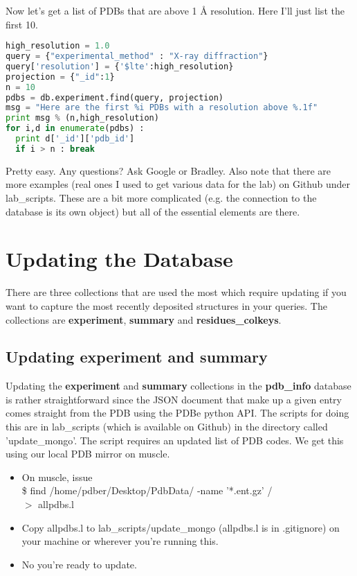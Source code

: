 \documentclass[12pt]{article}
\newcommand{\mdbdb}[1]{{\color{BlueViolet}\textbf{#1}}}
\newcommand{\mdbcol}[1]{{\color{Bittersweet}\textbf{#1}}}
\begin{document}
\noindent
Now let's get a list of PDBs that are above 1 \AA{} resolution.
Here I'll just list the first 10.

\begin{lstlisting}[language=python]
high_resolution = 1.0
query = {"experimental_method" : "X-ray diffraction"}
query['resolution'] = {'$lte':high_resolution}
projection = {"_id":1}
n = 10
pdbs = db.experiment.find(query, projection)
msg = "Here are the first %i PDBs with a resolution above %.1f"
print msg % (n,high_resolution)
for i,d in enumerate(pdbs) :
  print d['_id']['pdb_id']
  if i > n : break
\end{lstlisting}

\noindent
Pretty easy.
Any questions?
Ask Google or Bradley.
Also note that there are more examples (real ones I used to get various data for the lab) on Github under lab\_scripts.
These are a bit more complicated (e.g. the connection to the database is its own object) but all of the essential elements are there.

\section{Updating the Database}

There are three collections that are used the most which require updating if you want to capture the most recently deposited structures in your queries. The collections are \mdbcol{experiment}, \mdbcol{summary} and \mdbcol{residues\_colkeys}.

\subsection{Updating \mdbcol{experiment} and \mdbcol{summary}}

Updating the \mdbcol{experiment} and \mdbcol{summary} collections in the \mdbdb{pdb\_info} database is rather straightforward since the JSON document that make up a given entry comes straight from the PDB using the PDBe python API. The scripts for doing this are in lab\_scripts (which is available on Github) in the directory called 'update\_mongo'. The script requires an updated list of PDB codes. We get this using our local PDB mirror on muscle.

\begin{itemize}
\item On muscle, issue \\
\indent
\$ find /home/pdber/Desktop/PdbData/ -name '*.ent.gz' /\\ $>$ allpdbs.l
\item Copy allpdbs.l to lab\_scripts/update\_mongo (allpdbs.l is in .gitignore) on your machine or wherever you're running this.
\item No you're ready to update.
\end{itemize}
\end{document}
